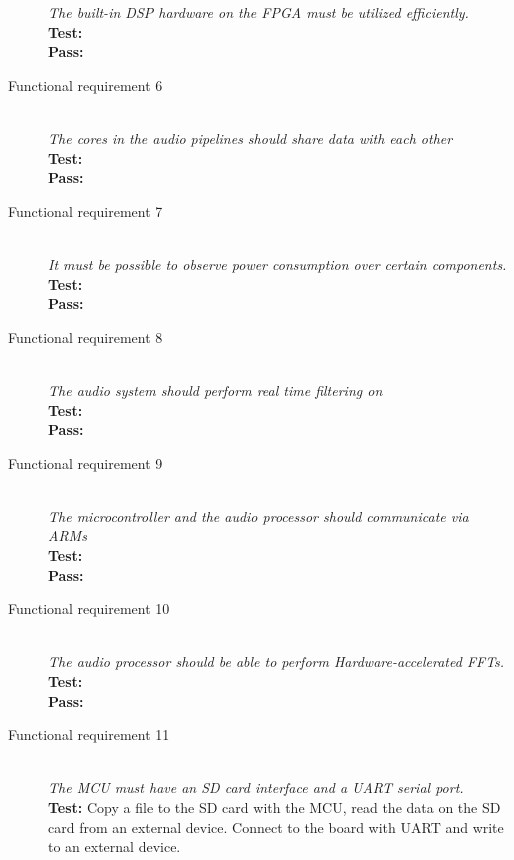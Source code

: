 \begin{description}
        \textit{The built-in DSP hardware on the FPGA must be utilized efficiently. } \\
        \textbf{Test:} \\
        \textbf{Pass:} \\
    \item[Functional requirement 6] \hfill \\
        \textit{The cores in the audio pipelines should share data with each other} \\
        \textbf{Test:} \\
        \textbf{Pass:} \\
    \item[Functional requirement 7] \hfill \\
        \textit{It must be possible to observe power consumption over certain components.} \\
        \textbf{Test:} \\
        \textbf{Pass:} \\
    \item[Functional requirement 8] \hfill \\
        \textit{The audio system should perform real time filtering on} \\
        \textbf{Test:} \\
        \textbf{Pass:} \\
    \item[Functional requirement 9] \hfill \\
        \textit{The microcontroller and the audio processor should communicate via ARMs} \\
        \textbf{Test:} \\
        \textbf{Pass:} \\
    \item[Functional requirement 10] \hfill \\
        \textit{The audio processor should be able to perform Hardware-accelerated FFTs.} \\
        \textbf{Test:} \\
        \textbf{Pass:} \\
    \item[Functional requirement 11] \hfill \\
        \textit{The MCU must have an SD card interface and a UART serial port.} \\
        \textbf{Test:} Copy a file to the SD card with the MCU, read the data on the SD card
        from an external device. Connect to the board with UART and write to an external device.\\

\end{description}
